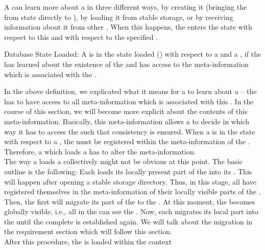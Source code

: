 \documentclass[a4paper, 12pt]{book}
\begin{document}
A  can learn more about a  in three different
ways, by creating it (bringing the  from state
\dbstateNIL directly to \dbstateLOADED), by loading it from stable
storage, or by receiving information about it from other
. When this happens, the  enters the state
\dbstateLOADED with respect to this  and with respect to
the specified .
%
\begin{definition*}{Database State Loaded: \dbstateLOADED}
  A  is in the state loaded (\dbstateLOADED) with respect
  to a  and a , if the  has
  learned about the existence of the  and has access to
  the meta-information which is associated with the .
\end{definition*}
%
In the above definition, we explicated what it means for a
 to learn about a  -- the  has to
have access to all meta-information which is associated with this
. In the course of this section, we will become more explicit
about the contents of this meta-information. Basically, this
meta-information allows a  to decide in which way it has
to access the  such that consistency is
ensured. When a  is in the state \dbstateLOADED with
respect to a , the  must be registered within
the meta-information of the .
%
Therefore, a  which loads a  has to alter the
 meta-information.\\
%
The way a  loads a  collectively might
not be obvious at this point. The basic outline is the following: Each
 loads its locally present part of the  into
its . This will happen after opening a
stable storage directory. Thus, in this stage, all  have
registered themselves in the meta-information of their locally visible
parts of the . Then, the first  will migrate
its part of the  to the . At this moment,
the  becomes globally visible, i.e., all 
in the  can see the . Now, each
 migrates its local part into the  until
the complete  is established again. We will talk about
the migration in the requirement section which will follow this
section.\\
%
After this procedure, the  is loaded within the context
\end{document}
